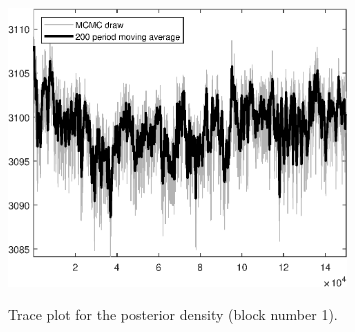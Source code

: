 \begin{figure}[H]
\centering
  \includegraphics[width=0.8\textwidth]{BRS_gen/graphs/TracePlot_Posterior_blck_1}\\
    \caption{Trace plot for the posterior density (block number 1).}
\end{figure}
